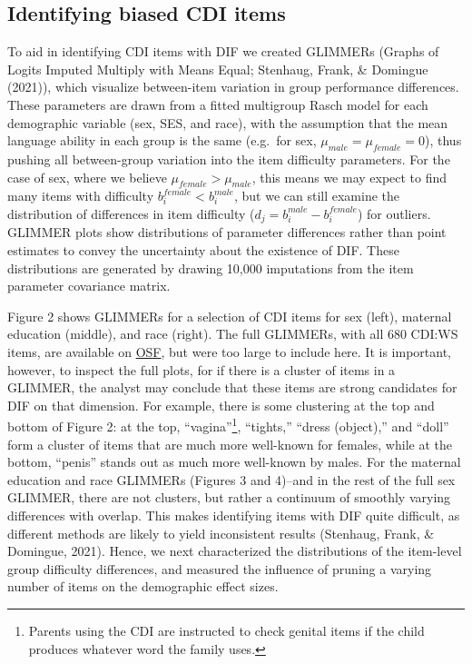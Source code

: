 \documentclass[10pt, letterpaper]{article}
\begin{document}
\hypertarget{identifying-biased-cdi-items}{%
\subsection{Identifying biased CDI
items}\label{identifying-biased-cdi-items}}

To aid in identifying CDI items with DIF we created GLIMMERs (Graphs of
Logits Imputed Multiply with Means Equal; Stenhaug, Frank, \& Domingue
(2021)), which visualize between-item variation in group performance
differences. These parameters are drawn from a fitted multigroup Rasch
model for each demographic variable (sex, SES, and race), with the
assumption that the mean language ability in each group is the same
(e.g.~for sex, \(\mu_{male}=\mu_{female}=0\)), thus pushing all
between-group variation into the item difficulty parameters. For the
case of sex, where we believe \(\mu_{female}>\mu_{male}\), this means we
may expect to find many items with difficulty
\(b_i^{female} < b_i^{male}\), but we can still examine the distribution
of differences in item difficulty (\(d_j = b_i^{male} - b_i^{female}\))
for outliers. GLIMMER plots show distributions of parameter differences
rather than point estimates to convey the uncertainty about the
existence of DIF. These distributions are generated by drawing 10,000
imputations from the item parameter covariance matrix.

Figure 2 shows GLIMMERs for a selection of CDI items for sex (left),
maternal education (middle), and race (right). The full GLIMMERs, with
all 680 CDI:WS items, are available on
\href{https://osf.io/57rsw/?view_only=2b6ecb61fe08458293af7421d276932a}{OSF},
but were too large to include here. It is important, however, to inspect
the full plots, for if there is a cluster of items in a GLIMMER, the
analyst may conclude that these items are strong candidates for DIF on
that dimension. For example, there is some clustering at the top and
bottom of Figure 2: at the top, ``vagina''\footnote{Parents using the
  CDI are instructed to check genital items if the child produces
  whatever word the family uses.}, ``tights,'' ``dress (object),'' and
``doll'' form a cluster of items that are much more well-known for
females, while at the bottom, ``penis'' stands out as much more
well-known by males. For the maternal education and race GLIMMERs
(Figures 3 and 4)--and in the rest of the full sex GLIMMER, there are
not clusters, but rather a continuum of smoothly varying differences
with overlap. This makes identifying items with DIF quite difficult, as
different methods are likely to yield inconsistent results (Stenhaug,
Frank, \& Domingue, 2021). Hence, we next characterized the
distributions of the item-level group difficulty differences, and
measured the influence of pruning a varying number of items on the
demographic effect sizes.
\end{document}
